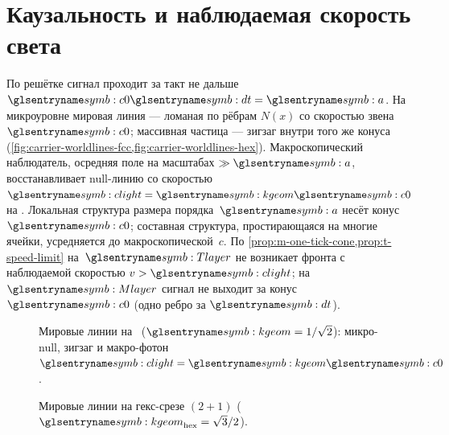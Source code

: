 \section{Каузальность и наблюдаемая скорость света}
\label{sec:c-light-cone}

По решётке сигнал проходит за такт не дальше~$\caSignalSpeed\htick=\caStepSpace$.
На микроуровне мировая линия --- ломаная по рёбрам $N(x)$ со скоростью звена~$\caSignalSpeed$;
массивная частица --- зигзаг внутри того же конуса (\cref{fig:carrier-worldlines-fcc,fig:carrier-worldlines-hex}).
Макроскопический наблюдатель, осредняя поле на масштабах $\gg\caStepSpace$,
восстанавливает null-линию со скоростью $\speedC=\caKappaGeom \caSignalSpeed$ на \latGCK.
Локальная структура размера порядка~$\caStepSpace$ несёт конус~$\caSignalSpeed$;
составная структура, простирающаяся на многие ячейки, усредняется до макроскопической~$c$.
По \cref{prop:m-one-tick-cone,prop:t-speed-limit} на~$\Tlayer$ не возникает фронта
с наблюдаемой скоростью $v>\speedC$; на~$\Mlayer$ сигнал не выходит за конус~$\caSignalSpeed$
(одно ребро за $\htick$).

\begin{figure}[htbp]
  \centering
  
  \caption{Мировые линии на \latGCKshort\ ($\caKappaGeom=1/\sqrt{2}$): микро-null, зигзаг и макро-фотон $\speedC=\caKappaGeom \caSignalSpeed$.}
  \label{fig:carrier-worldlines-fcc}
\end{figure}

\begin{figure}[htbp]
  \centering
  
  \caption{Мировые линии на гекс-срезе $(2{+}1)$ ($\caKappaGeom_{\mathrm{hex}}=\sqrt{3}/2$).}
  \label{fig:carrier-worldlines-hex}
\end{figure}

